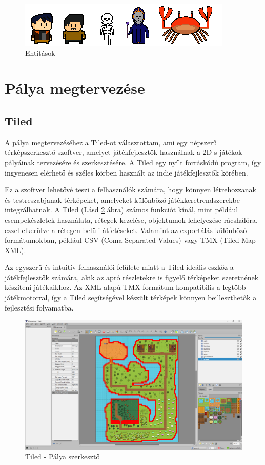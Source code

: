 \begin{figure}[H]
    \centering
    \includegraphics[width=12.0truecm]{images/entities.png}
    \caption{Entitások}
    \label{fig:Entitások}
\end{figure}


\section{Pálya megtervezése}

\subsection{Tiled}
\label{subsec:Tiled}
 A pálya megtervezéséhez a Tiled-ot \cite{Tiled} választottam, ami egy népszerű térképszerkesztő szoftver, amelyet játékfejlesztők használnak a 2D-s játékok pályáinak tervezésére és szerkesztésére.   A Tiled egy nyílt forráskódú program, így ingyenesen elérhető és széles körben használt az indie játékfejlesztők körében.

Ez a szoftver lehetővé teszi a felhasználók számára, hogy könnyen létrehozzanak és testreszabjanak térképeket, amelyeket különböző játékkeretrendszerekbe integrálhatnak. A Tiled (Lásd \ref{fig:Tiled} ábra) számos funkciót kínál, mint például csempekészletek használata, rétegek kezelése, objektumok lehelyezése rácshálóra, ezzel elkerülve a rétegen belüli átfetéseket. Valamint az exportálás különböző formátumokban, például CSV (Coma-Separated Values) vagy TMX (Tiled Map XML).

Az egyszerű és intuitív felhasználói felülete miatt a Tiled ideális eszköz a játékfejlesztők számára, akik az apró részletekre is figyelő térképeket szeretnének készíteni játékaikhoz. Az XML alapú TMX formátum kompatibilis a legtöbb játékmotorral, így a Tiled segítségével készült térképek könnyen beilleszthetők a fejlesztési folyamatba.

\begin{figure}[H]
    \centering
    \includegraphics[width=14.0truecm]{images/Tiled.png}
    \caption{Tiled - Pálya szerkesztő
    \cite{Tiled}}
    \label{fig:Tiled}
\end{figure}


